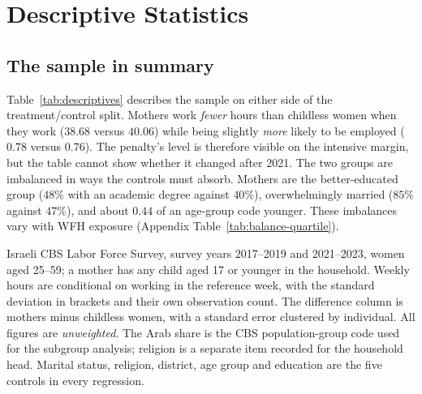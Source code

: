 \documentclass[12pt,a4paper]{article}
\begin{document}
\section{Descriptive Statistics}\label{sec:descriptives}

\subsection{The sample in summary}\label{sec:desc-table}

Table~\ref{tab:descriptives} describes the sample on either side of the treatment/control split.
Mothers work \emph{fewer} hours than childless women when they work ($38.68$ versus $40.06$)
while being slightly \emph{more} likely to be employed ($0.78$ versus $0.76$). The penalty's
level is therefore visible on the intensive margin, but the table cannot show whether it changed
after 2021. The two groups are imbalanced in ways the controls must absorb. Mothers are
the better-educated group ($48\%$ with an academic degree against $40\%$), overwhelmingly married
($85\%$ against $47\%$), and about $0.44$ of an age-group code younger. These imbalances vary
with WFH exposure (Appendix Table~\ref{tab:balance-quartile}).

\begin{table}[htbp]
\centering
\begin{threeparttable}
\caption{Summary statistics: women aged 25--59, by mother status}\label{tab:descriptives}
\renewcommand{\baselinestretch}{1}\footnotesize
\setlength{\tabcolsep}{4pt}

\begin{tablenotes}\small
\item Israeli CBS Labor Force Survey, survey years 2017--2019 and 2021--2023, women aged 25--59;
a mother has any child aged 17 or younger in the household. Weekly hours are conditional on working in the
reference week, with the standard deviation in brackets and their own observation count. The
difference column is mothers minus childless women, with a standard error clustered by individual.
All figures are \emph{unweighted}. The Arab share is the CBS population-group code used for the
subgroup analysis; religion is a separate item recorded for the household head. Marital status,
religion, district, age group and education are the five controls in every regression.
\end{tablenotes}
\end{threeparttable}
\end{table}
\end{document}
